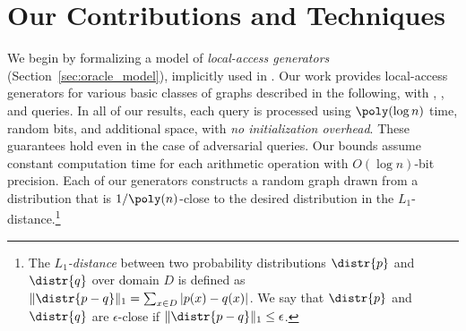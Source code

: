 \section{Our Contributions and Techniques}

We begin by formalizing a model of {\em local-access generators}
(Section~\ref{sec:oracle_model}), implicitly used in \cite{reut}.
Our work provides local-access generators for various
basic classes of graphs described in the following, with 
, , and 
queries.  In all of our results,
each query is processed using $\poly(\log n)$
time, random bits, and additional space, with \emph{no initialization overhead}.
These guarantees hold even in the case of adversarial queries.
Our bounds assume constant computation time for each arithmetic operation with
$O(\log n)$-bit precision. Each of our generators constructs a random graph
drawn from a distribution that is $1/\poly(n)$-close
to the desired distribution in the $L_1$-distance.\footnote{The \emph{$L_1$-distance} between two probability distributions $\distr{p}$
and $\distr{q}$ over domain $D$ is defined as $\|\distr{p-q}\|_1 = 
\sum_{x \in D } |p(x)-q(x)|$.
We say that $\distr{p}$ and $\distr{q}$ are $\epsilon$-close if $\|\distr{p-q}\|_1 \leq \epsilon$.
}



